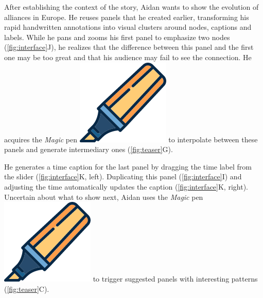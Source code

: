 





After establishing the context of the story, Aidan wants to show the evolution of alliances in Europe. He reuses panels that he created earlier, transforming his rapid handwritten annotations into visual clusters around nodes, captions and labels. While he pans and zooms his first panel to emphasize two nodes (\autoref{fig:interface}J), he realizes that the difference between this panel and the first one may be too great and that his audience may fail to see the connection. He acquires the \textit{Magic} pen \includegraphics[scale=0.05]{figures/annotation_pen.png} to interpolate between these panels and generate intermediary ones (\autoref{fig:teaser}G). 

He generates a time caption for the last panel by dragging  the time label from the slider (\autoref{fig:interface}K, left). Duplicating this panel (\autoref{fig:interface}I) and adjusting the time automatically updates the caption (\autoref{fig:interface}K, right). Uncertain about what to show next, Aidan uses the \textit{Magic} pen \includegraphics[scale=0.05]{figures/annotation_pen.png} to trigger suggested panels with interesting patterns  (\autoref{fig:teaser}C). 



